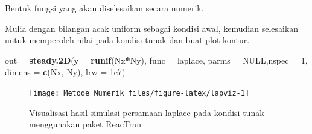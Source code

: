 \documentclass[
]{book}
\newenvironment{Shaded}{\begin{snugshade}}{\end{snugshade}}
\newcommand{\AttributeTok}[1]{\textcolor[rgb]{0.13,0.29,0.53}{#1}}
\newcommand{\ConstantTok}[1]{\textcolor[rgb]{0.56,0.35,0.01}{#1}}
\newcommand{\ControlFlowTok}[1]{\textcolor[rgb]{0.13,0.29,0.53}{\textbf{#1}}}
\newcommand{\DecValTok}[1]{\textcolor[rgb]{0.00,0.00,0.81}{#1}}
\newcommand{\FloatTok}[1]{\textcolor[rgb]{0.00,0.00,0.81}{#1}}
\newcommand{\FunctionTok}[1]{\textcolor[rgb]{0.13,0.29,0.53}{\textbf{#1}}}
\newcommand{\NormalTok}[1]{#1}
\newcommand{\OtherTok}[1]{\textcolor[rgb]{0.56,0.35,0.01}{#1}}
\newcommand{\SpecialCharTok}[1]{\textcolor[rgb]{0.81,0.36,0.00}{\textbf{#1}}}
\theoremstyle{definition}
\theoremstyle{definition}
\theoremstyle{definition}
\theoremstyle{definition}
\theoremstyle{remark}
\begin{document}
Bentuk fungsi yang akan diselesaikan secara numerik.

\begin{Shaded}
\end{Shaded}

Mulia dengan bilangan acak uniform sebagai kondisi awal, kemudian selesaikan untuk memperoleh nilai pada kondisi tunak dan buat plot kontur.

\begin{Shaded}
\begin{Highlighting}[]
\NormalTok{out }\OtherTok{=} \FunctionTok{steady.2D}\NormalTok{(}\AttributeTok{y =} \FunctionTok{runif}\NormalTok{(Nx}\SpecialCharTok{*}\NormalTok{Ny), }\AttributeTok{func =}\NormalTok{ laplace, }
                  \AttributeTok{parms =} \ConstantTok{NULL}\NormalTok{,}\AttributeTok{nspec =} \DecValTok{1}\NormalTok{, }
                  \AttributeTok{dimens =} \FunctionTok{c}\NormalTok{(Nx, Ny), }\AttributeTok{lrw =} \FloatTok{1e7}\NormalTok{)}
\end{Highlighting}
\end{Shaded}

\begin{figure}

{\centering \texttt{[image: Metode\_Numerik\_files/figure-latex/lapviz-1]} 

}

\caption{Visualisasi hasil simulasi persamaan laplace pada kondisi tunak menggunakan paket ReacTran}\label{fig:lapviz}
\end{figure}
\end{document}

